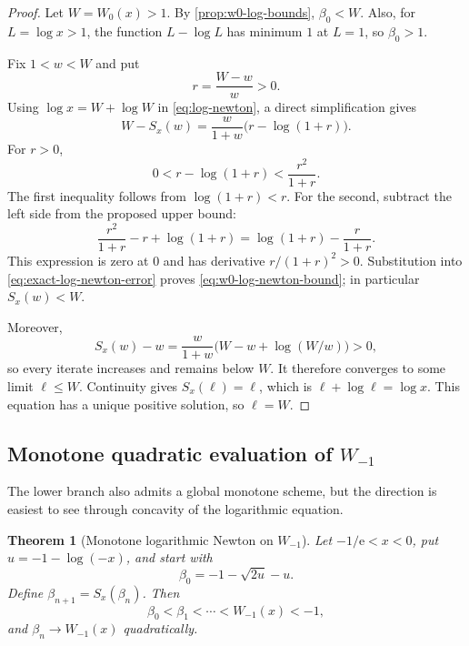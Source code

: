 \documentclass[11pt]{article}
\numberwithin{equation}{section}
\newtheorem{theorem}{Theorem}[section]
\theoremstyle{definition}
\theoremstyle{remark}
\newcommand{\e}{\mathrm e}
\begin{document}
\begin{proof}
Let $W=W_0(x)>1$.  By \cref{prop:w0-log-bounds}, $\beta_0<W$.  Also, for
$L=\log x>1$, the function $L-\log L$ has minimum $1$ at $L=1$, so
$\beta_0>1$.

Fix $1<w<W$ and put
\[
 r=\frac{W-w}{w}>0.
\]
Using $\log x=W+\log W$ in \eqref{eq:log-newton}, a direct simplification
gives
\begin{equation}
 W-S_x(w)=\frac{w}{1+w}\bigl(r-\log(1+r)\bigr).       \label{eq:exact-log-newton-error}
\end{equation}
For $r>0$,
\[
 0<r-\log(1+r)<\frac{r^2}{1+r}.                       \label{eq:r-log-ineq}
\]
The first inequality follows from $\log(1+r)<r$.  For the second, subtract
the left side from the proposed upper bound:
\[
 \frac{r^2}{1+r}-r+\log(1+r)
 =\log(1+r)-\frac{r}{1+r}.
\]
This expression is zero at $0$ and has derivative
$r/(1+r)^2>0$.  Substitution into
\eqref{eq:exact-log-newton-error} proves
\eqref{eq:w0-log-newton-bound}; in particular $S_x(w)<W$.

Moreover,
\[
 S_x(w)-w
 =\frac{w}{1+w}\bigl(W-w+\log(W/w)\bigr)>0,
\]
so every iterate increases and remains below $W$.  It therefore converges to
some limit $\ell\le W$.  Continuity gives $S_x(\ell)=\ell$, which is
$\ell+\log\ell=\log x$.  This equation has a unique positive solution, so
$\ell=W$.
\end{proof}

\subsection{Monotone quadratic evaluation of \texorpdfstring{$W_{-1}$}{W-1}}

The lower branch also admits a global monotone scheme, but the direction is
easiest to see through concavity of the logarithmic equation.

\begin{theorem}[Monotone logarithmic Newton on $W_{-1}$]
\label{thm:wm1-monotone-newton}
Let $-1/\e<x<0$, put $u=-1-\log(-x)$, and start with
\[
 \beta_0=-1-\sqrt{2u}-u.
\]
Define $\beta_{n+1}=S_x(\beta_n)$.  Then
\begin{equation}
 \beta_0<\beta_1<\cdots<W_{-1}(x)<-1,                 \label{eq:wm1-monotone-chain}
\end{equation}
and $\beta_n\to W_{-1}(x)$ quadratically.
\end{theorem}
\end{document}
